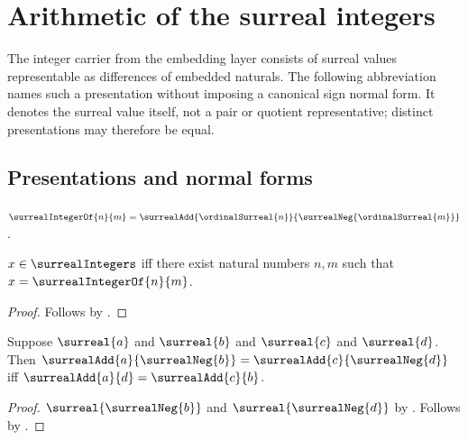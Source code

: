 \section{Arithmetic of the surreal integers}



The integer carrier from the embedding layer consists of surreal values
representable as differences of embedded naturals.  The following
abbreviation names such a presentation without imposing a canonical sign
normal form.  It denotes the surreal value itself, not a pair or quotient
representative; distinct presentations may therefore be equal.

\subsection{Presentations and normal forms}

\begin{abbreviation}\label{surreal_integer_of}
    $\surrealIntegerOf{n}{m}=
        \surrealAdd{\ordinalSurreal{n}}
            {\surrealNeg{\ordinalSurreal{m}}}$.
\end{abbreviation}

\begin{proposition}\label{surreal_integer_of_iff}
    $x\in\surrealIntegers$ iff there exist natural numbers $n,m$ such that
        $x=\surrealIntegerOf{n}{m}$.
\end{proposition}
\begin{proof}
    Follows by .
\end{proof}

\begin{lemma}\label{surreal_difference_equality_iff}
    Suppose $\surreal{a}$ and $\surreal{b}$ and
        $\surreal{c}$ and $\surreal{d}$.
    Then
        $\surrealAdd{a}{\surrealNeg{b}}
            =\surrealAdd{c}{\surrealNeg{d}}$ iff
        $\surrealAdd{a}{d}=\surrealAdd{c}{b}$.
\end{lemma}
\begin{proof}
    $\surreal{\surrealNeg{b}}$ and $\surreal{\surrealNeg{d}}$
        by .
    Follows by
        .
\end{proof}

